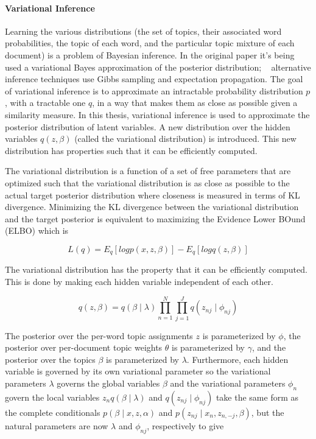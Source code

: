 \documentclass[12pt]{report}
\begin{document}
\paragraph{Variational Inference}

Learning the various distributions (the set of topics, their associated word
probabilities, the topic of each word, and the particular topic mixture of each
document) is a problem of Bayesian inference. In the original paper it's being
used a variational Bayes approximation of the posterior distribution;
~\cite{blei2003latent} alternative inference techniques use Gibbs sampling and
expectation propagation. The goal of variational inference is to approximate an
intractable probability distribution $p$, with a tractable one $q$, in a way
that makes them as close as possible given a similarity measure. In this thesis,
variational inference is used to approximate the posterior distribution of
latent variables. A new distribution over the hidden variables $q(z, \beta)$
(called the variational distribution) is  introduced. This new distribution has
properties such that it can be efficiently computed. 

The variational distribution is a function of a set of free parameters that are optimized such that the variational distribution is as close as possible to the 
actual target posterior distribution where closeness is measured in terms of KL divergence.
Minimizing the KL divergence between the variational distribution and the target
posterior is equivalent to maximizing the Evidence Lower BOund (ELBO) which is

\begin{equation}
L(q) = E_q [log p(x, z, \beta)] -  E_q [log q(z, \beta)]  
\end{equation}

The variational distribution has the property that it can be efficiently
computed. This is done by making each hidden variable independent of each other.

\begin{equation}
q(z, \beta) = q(\beta \mid \lambda) \prod\limits_{n=1}^N \prod\limits_{j=1}^J q(z_{nj} \mid \phi_{nj})   
\end{equation}

The posterior over the per-word topic assignments $z$ is parameterized by
$\phi$, the posterior over per-document topic weights $\theta$ is parameterized
by $\gamma$, and the posterior over the topics $\beta$ is parameterized by
$\lambda$. Furthermore, each hidden variable is governed by its own variational
parameter so the variational parameters $\lambda$ governs the global variables
$\beta$ and the variational parameters $\phi_n$ govern the local variables $z_n
q(\beta \mid \lambda)$ and $q(z_{nj} \mid \phi_{nj})$ take the same form as the
complete conditionals $p(\beta \mid x, z, \alpha)$ and $p(z_{nj} \mid x_n, z_{n,
-j}, \beta)$, but the natural parameters are now $\lambda$ and $\phi_{nj}$,
respectively to give
\end{document}
